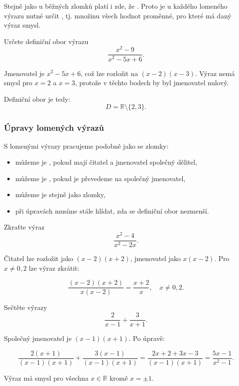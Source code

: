 \documentclass[12pt,a4paper]{article}
\begin{document}
Stejně jako u běžných zlomků platí i zde, že .  
Proto je u každého lomeného výrazu nutné určit , tj. množinu všech hodnot proměnné,  
pro které má daný výraz smysl.

\begin{examplebox}
Určete definiční obor výrazu
\[
\frac{x^2 - 9}{x^2 - 5x + 6}.
\]

Jmenovatel je $x^2 - 5x + 6$, což lze rozložit na $(x-2)(x-3)$.  
Výraz nemá smysl pro $x=2$ a $x=3$, protože v těchto bodech by byl jmenovatel nulový.

Definiční obor je tedy:
\[
D = \mathbb{R} \setminus \{2,3\}.
\]
\end{examplebox}

\subsubsection*{Úpravy lomených výrazů}

S lomenými výrazy pracujeme podobně jako se zlomky:  
\begin{itemize}
    \item můžeme je , pokud mají čitatel a jmenovatel společný dělitel,
    \item můžeme je , pokud je převedeme na společný jmenovatel,
    \item můžeme je  stejně jako zlomky,
    \item při úpravách musíme stále hlídat, zda se definiční obor nezmenší.
\end{itemize}

\begin{examplebox}
Zkraťte výraz
\[
\frac{x^2 - 4}{x^2 - 2x}.
\]

Čitatel lze rozložit jako $(x-2)(x+2)$, jmenovatel jako $x(x-2)$.  
Pro $x \neq 0,2$ lze výraz zkrátit:

\[
\frac{(x-2)(x+2)}{x(x-2)} = \frac{x+2}{x}, \quad x \neq 0,2.
\]
\end{examplebox}

\begin{examplebox}
Sečtěte výrazy
\[
\frac{2}{x-1} + \frac{3}{x+1}.
\]

Společný jmenovatel je $(x-1)(x+1)$. Po úpravě:

\[
\frac{2(x+1)}{(x-1)(x+1)} + \frac{3(x-1)}{(x-1)(x+1)} = \frac{2x+2 + 3x-3}{(x-1)(x+1)} = \frac{5x-1}{x^2-1}.
\]

Výraz má smysl pro všechna $x \in \mathbb{R}$ kromě $x=\pm 1$.
\end{examplebox}
\end{document}
